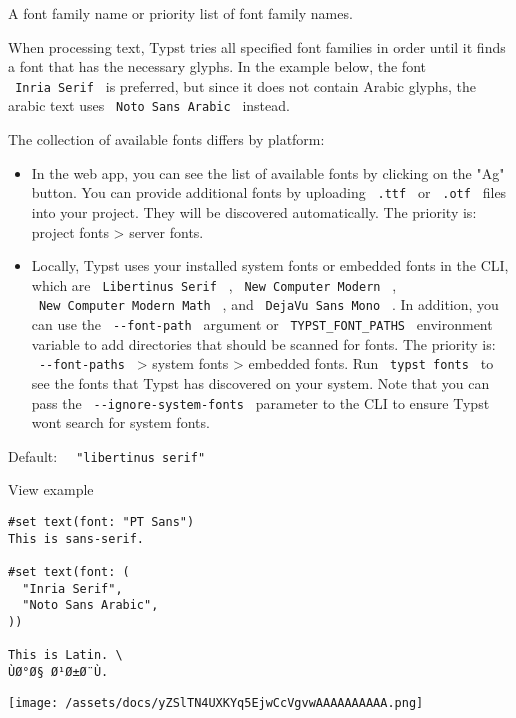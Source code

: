 A font family name or priority list of font family names.

When processing text, Typst tries all specified font families in order
until it finds a font that has the necessary glyphs. In the example
below, the font \texttt{\ Inria\ Serif\ } is preferred, but since it
does not contain Arabic glyphs, the arabic text uses
\texttt{\ Noto\ Sans\ Arabic\ } instead.

The collection of available fonts differs by platform:

\begin{itemize}
\item
  In the web app, you can see the list of available fonts by clicking on
  the "Ag" button. You can provide additional fonts by uploading
  \texttt{\ .ttf\ } or \texttt{\ .otf\ } files into your project. They
  will be discovered automatically. The priority is: project fonts
  \textgreater{} server fonts.
\item
  Locally, Typst uses your installed system fonts or embedded fonts in
  the CLI, which are \texttt{\ Libertinus\ Serif\ } ,
  \texttt{\ New\ Computer\ Modern\ } ,
  \texttt{\ New\ Computer\ Modern\ Math\ } , and
  \texttt{\ DejaVu\ Sans\ Mono\ } . In addition, you can use the
  \texttt{\ -\/-font-path\ } argument or \texttt{\ TYPST\_FONT\_PATHS\ }
  environment variable to add directories that should be scanned for
  fonts. The priority is: \texttt{\ -\/-font-paths\ } \textgreater{}
  system fonts \textgreater{} embedded fonts. Run
  \texttt{\ typst\ fonts\ } to see the fonts that Typst has discovered
  on your system. Note that you can pass the
  \texttt{\ -\/-ignore-system-fonts\ } parameter to the CLI to ensure
  Typst won\textquotesingle t search for system fonts.
\end{itemize}

Default: \texttt{\ }{\texttt{\ "libertinus\ serif"\ }}\texttt{\ }


View example

\begin{verbatim}
#set text(font: "PT Sans")
This is sans-serif.

#set text(font: (
  "Inria Serif",
  "Noto Sans Arabic",
))

This is Latin. \
ÙØ°Ø§ Ø¹Ø±Ø¨Ù.
\end{verbatim}

\texttt{[image: /assets/docs/yZSlTN4UXKYq5EjwCcVgvwAAAAAAAAAA.png]}

